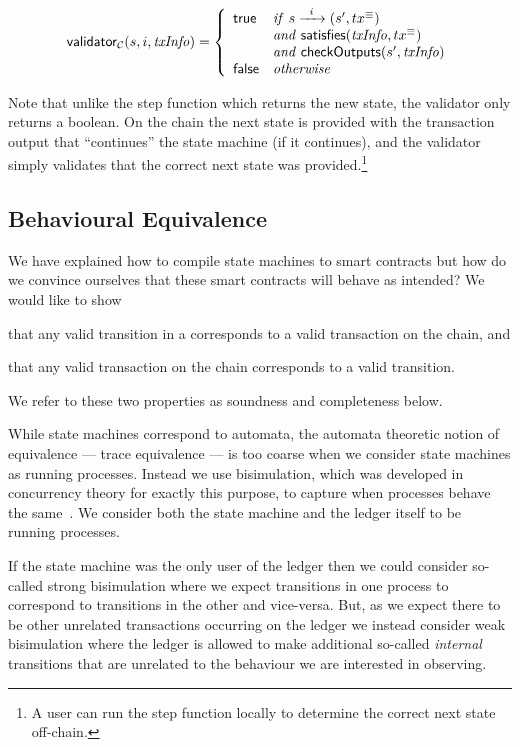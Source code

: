 \[
\mathsf{validator}_\mathcal{C}(s, i, \mathit{txInfo}) = \left\{
  \begin{array}{lll}
  \textsf{true}  & \mathit{if} \  s \xrightarrow{\hspace{5pt} i \hspace{5pt}} (s' , tx^\equiv)  \\
         & \mathit{and} \ \mathsf{satisfies}(\mathit{txInfo}, tx^\equiv) \\
         & \mathit{and} \ \mathsf{checkOutputs}(s', \mathit{txInfo}) \\
  \textsf{false} & \mathit{otherwise}
  \end{array}
\right.
\]

\noindent
Note that unlike the step function which returns the new state, the
validator only returns a boolean. On the chain the next state is
provided with the transaction output that ``continues'' the state
machine (if it continues), and the validator simply validates that
the correct next state was provided.\footnote{
A user can run the step function locally to determine the correct next state off-chain.
}

\subsection{Behavioural Equivalence}
We have explained how to compile state machines to smart contracts but
how do we convince ourselves that these smart contracts will behave as
intended? We would like to show
\begin{inparaenum}[(1)]
\item that any valid transition in a \CEM{} corresponds to a valid transaction
  on the chain, and
\item that any valid transaction on the chain corresponds to a valid transition.
\end{inparaenum}
We refer to these two properties as soundness and completeness below.

While state machines correspond to automata, the automata theoretic
notion of equivalence --- trace equivalence --- is too coarse when we
consider state machines as running processes. Instead we use
bisimulation, which was developed in concurrency theory for exactly
this purpose, to capture when processes behave the
same~\cite{sangiorgi}. We consider both the state machine and the
ledger itself to be running processes.

If the state machine was the only user of the ledger then we could
consider so-called strong bisimulation where we expect transitions in
one process to correspond to transitions in the other and
vice-versa. But, as we expect there to be other unrelated transactions
occurring on the ledger we instead consider weak bisimulation where
the ledger is allowed to make additional so-called \emph{internal}
transitions that are unrelated to the behaviour we are interested in
observing.

